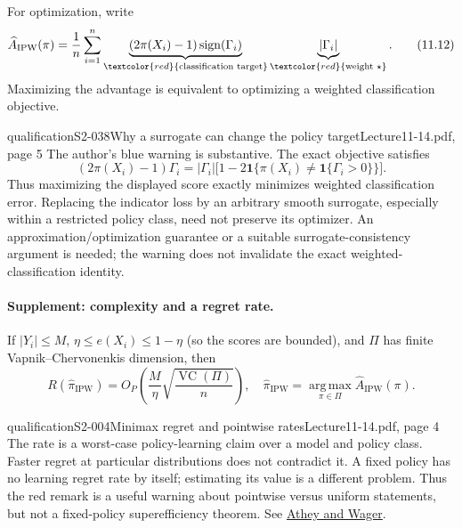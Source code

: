 For optimization, write
\[
 \widehat A_{\mathrm{IPW}}(\pi)
 =\frac1n\sum_{i=1}^n
 \underbrace{(2\pi(X_i)-1)\operatorname{sign}(\Gamma_i)}_{\textcolor{red}{\text{classification target}}}
 \underbrace{|\Gamma_i|}_{\textcolor{red}{\text{weight }\star}}.\tag{11.12}
\]
 Maximizing the advantage is equivalent to optimizing a weighted classification objective. 

\begin{reviewnote}{qualification}{S2-038}{Why a surrogate can change the policy target}{Lecture11-14.pdf, page 5}
The author's blue warning is substantive. The exact objective satisfies
\[
 (2\pi(X_i)-1)\Gamma_i
 =|\Gamma_i|\bigl[1-2\mathbf1\{\pi(X_i)\ne\mathbf1\{\Gamma_i>0\}\}\bigr].
\]
Thus maximizing the displayed score exactly minimizes weighted classification error. Replacing the indicator loss by an arbitrary smooth surrogate, especially within a restricted policy class, need not preserve its optimizer. An approximation/optimization guarantee or a suitable surrogate-consistency argument is needed; the warning does not invalidate the exact weighted-classification identity.
\end{reviewnote}

\paragraph{Supplement: complexity and a regret rate.}
 If $|Y_i|\le M$, $\eta\le e(X_i)\le1-\eta$ (so the scores are bounded), and $\Pi$ has finite Vapnik--Chervonenkis dimension, then
\[
 R(\widehat\pi_{\mathrm{IPW}})
 =O_P\left(\frac M\eta\sqrt{\frac{\operatorname{VC}(\Pi)}n}\right),
 \quad
 \widehat\pi_{\mathrm{IPW}}=
 \operatorname*{arg\,max}_{\pi\in\Pi}\widehat A_{\mathrm{IPW}}(\pi).
\]

\begin{reviewnote}{qualification}{S2-004}{Minimax regret and pointwise rates}{Lecture11-14.pdf, page 4}
The rate is a worst-case policy-learning claim over a model and policy class. Faster regret at particular distributions does not contradict it. A fixed policy has no learning regret rate by itself; estimating its value is a different problem. Thus the red remark is a useful warning about pointwise versus uniform statements, but not a fixed-policy superefficiency theorem. See \href{https://arxiv.org/abs/1702.02896}{Athey and Wager}.
\end{reviewnote}


